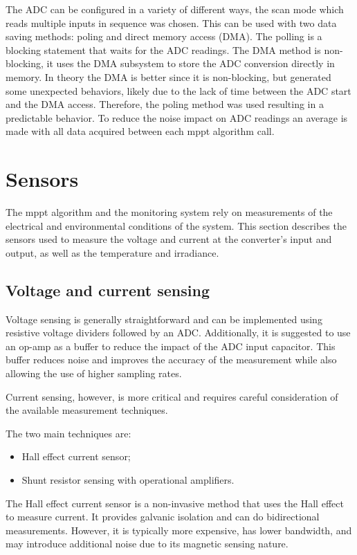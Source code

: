         The ADC can be configured in a variety of different ways, the scan mode which reads multiple inputs in sequence was chosen. This can be used with two data saving methods: poling and direct memory access (DMA). The polling is a blocking statement that waits for the ADC readings. The DMA method is non-blocking, it uses the DMA subsystem to store the ADC conversion directly in memory. In theory the DMA is better since it is non-blocking, but generated some unexpected behaviors, likely due to the lack of time between the ADC start and the DMA access. Therefore, the poling method was used resulting in a predictable behavior. To reduce the noise impact on ADC readings an average is made with all data acquired between each \ac{mppt} algorithm call. 

\section{Sensors} 
The \ac{mppt} algorithm and the monitoring system rely on measurements of the electrical and environmental conditions of the system. This section describes the sensors used to measure the voltage and current at the converter's input and output, as well as the temperature and irradiance.

\subsection{Voltage and current sensing}
    Voltage sensing is generally straightforward and can be implemented using resistive voltage dividers followed by an ADC. Additionally, it is suggested to use an op-amp as a buffer to reduce the impact of the ADC input capacitor. This buffer reduces noise and improves the accuracy of the measurement while also allowing the use of higher sampling rates.
    
    Current sensing, however, is more critical and requires careful consideration of the available measurement techniques.

    The two main techniques are:
    \begin{itemize}[leftmargin=4em, itemsep=1pt, topsep=2pt]
        \item Hall effect current sensor;
        \item Shunt resistor sensing with operational amplifiers.
    \end{itemize}

    The Hall effect current sensor is a non-invasive method that uses the Hall effect to measure current. It provides galvanic isolation and can do bidirectional measurements. However, it is typically more expensive, has lower bandwidth, and may introduce additional noise due to its magnetic sensing nature.


